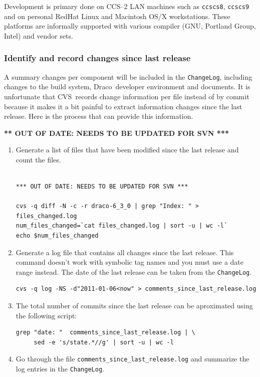 \documentclass[note]{newmemo}
\newcommand{\draco}{{\normalfont\small\sffamily Draco}}
\newcommand{\cvs}{\textsf{CVS}}
\begin{document}
Development is primary done on CCS--2 LAN machines such as
\texttt{ccscs8}, \texttt{ccscs9} and on personal RedHat Linux and
Macintosh OS/X workstations.  These platforms are informally supported
with various compiler (GNU, Portland Group, Intel) and vendor sets.  


\subsubsection{Identify and record changes since last release}
\label{sec:changes_since_lr}

A summary changes per component will be included in the
\texttt{ChangeLog}, including changes to the build system,
\draco\ developer environment and documents. It is unfortunate that
\cvs\ records change information per file instead of by commit because
it makes it a bit painful to extract information changes since the
last release.  Here is the process that can provide this information.

{\bf *** OUT OF DATE: NEEDS TO BE UPDATED FOR SVN ***}

\begin{enumerate}
\item Generate a list of files that have been modified since the last
  release and count the files.
\begin{lstlisting}[basicstyle=\footnotesize, xleftmargin=1.0in, 
  xrightmargin=1.0in]

*** OUT OF DATE: NEEDS TO BE UPDATED FOR SVN ***

cvs -q diff -N -c -r draco-6_3_0 | grep "Index: " > files_changed.log
num_files_changed=`cat files_changed.log | sort -u | wc -l`
echo $num_files_changed
\end{lstlisting}
\item Generate a log file that contains all changes since the last
  release.  This command doesn't work with symbolic tag names and you
  must use a date range instead.  The date of the last release can be
  taken from the \texttt{ChangeLog}.
\begin{lstlisting}[basicstyle=\footnotesize, xleftmargin=1.0in, 
  xrightmargin=1.0in]
cvs -q log -NS -d"2011-01-06<now" > comments_since_last_release.log
\end{lstlisting}
\item The total number of commits since the last release can be
  aproximated using the following script:
\begin{lstlisting}[basicstyle=\footnotesize, xleftmargin=1.0in, 
  xrightmargin=1.0in]
grep "date: "  comments_since_last_release.log | \
     sed -e 's/state.*//g' | sort -u | wc -l
\end{lstlisting}
\item Go through the file \texttt{comments\_since\_last\_release.log}
  and summarize the log entries in the \texttt{ChangeLog}.
\end{enumerate}
\end{document}
